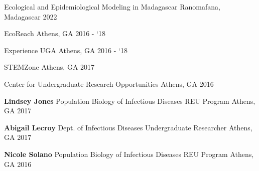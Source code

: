 

\begin{cvhonors}

    \cvhonor
      {Ecological and Epidemiological Modeling in Madagascar}
      {}
      {Ranomafana, Madagascar}
      {2022}

    \cvhonor
      {EcoReach}
      {}
      {Athens, GA}
      {2016 - `18}

    \cvhonor
      {Experience UGA}
      {}
      {Athens, GA}
      {2016 - `18}

    \cvhonor
      {STEMZone}
      {}
      {Athens, GA}
      {2017}

    \cvhonor
      {Center for Undergraduate Research Opportunities} %
      {} %
      {Athens, GA} %
      {2016} %
\end{cvhonors}

\begin{cvhonors}

  \cvhonor
    {\textbf{Lindsey Jones}} %
    {Population Biology of Infectious Diseases REU Program} %
    {Athens, GA} %
    {2017} %

  \cvhonor
    {\textbf{Abigail Lecroy}} %
    {Dept. of Infectious Diseases Undergraduate Researcher} %
    {Athens, GA} %
    {2017} %

  \cvhonor
    {\textbf{Nicole Solano}} %
    {Population Biology of Infectious Diseases REU Program} %
    {Athens, GA} %
    {2016} %

\end{cvhonors}

